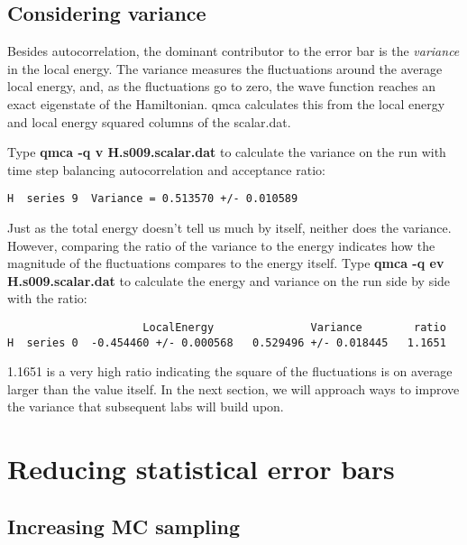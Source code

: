\subsection{Considering variance}

Besides autocorrelation, the dominant contributor to the error bar is the
\textit{variance} in the local energy.  The variance measures the fluctuations
around the average local energy, and, as the fluctuations go to zero, the wave
function reaches an exact eigenstate of the Hamiltonian.  qmca calculates this
from the local energy and local energy squared columns of the scalar.dat. 

Type \textbf{qmca -q v H.s009.scalar.dat} to calculate the variance on the run
with time step balancing autocorrelation and acceptance ratio:

\begin{shaded}
\begin{verbatim}
H  series 9  Variance = 0.513570 +/- 0.010589  
\end{verbatim}
\end{shaded}

Just as the total energy doesn't tell us much by itself, neither does the
variance.  However, comparing the ratio of the variance to the energy indicates
how the magnitude of the fluctuations compares to the energy itself.   Type
\textbf{qmca -q ev H.s009.scalar.dat} to calculate the energy and variance on
the run side by side with the ratio:

\begin{shaded}
\begin{verbatim}
                     LocalEnergy               Variance        ratio
H  series 0  -0.454460 +/- 0.000568   0.529496 +/- 0.018445   1.1651
\end{verbatim}
\end{shaded}

1.1651 is a very high ratio indicating the square of the fluctuations is on
average larger than the value itself.  In the next section, we will approach
ways to improve the variance that subsequent labs will build upon.  

\section{Reducing statistical error bars}

\subsection{Increasing MC sampling}

